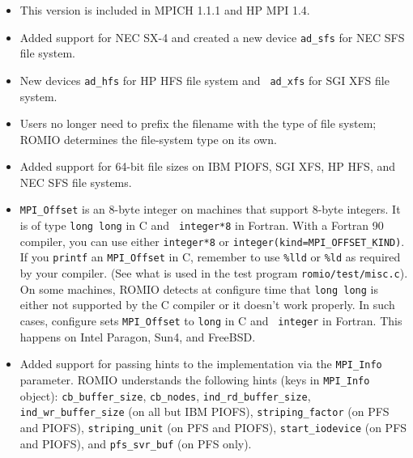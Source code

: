 \begin{itemize}
\item This version is included in MPICH 1.1.1 and HP MPI 1.4.

\item Added support for NEC SX-4 and created a new device {\tt ad\_sfs} for
NEC SFS file system.

\item New devices {\tt ad\_hfs} for HP HFS file system and {\tt
ad\_xfs} for SGI XFS file system.

\item Users no longer need to prefix the filename with the type of 
file system; ROMIO determines the file-system type on its own.

\item Added support for 64-bit file sizes on IBM PIOFS, SGI XFS,
HP HFS, and NEC SFS file systems.

\item {\tt MPI\_Offset} is an 8-byte integer on machines that support
8-byte integers. It is of type {\tt long long} in C and {\tt
integer*8} in Fortran. With a Fortran 90 compiler, you can use either
{\tt integer*8} or  {\tt integer(kind=MPI\_OFFSET\_KIND)}. 
If you {\tt printf} an {\tt MPI\_Offset} in C, remember to use {\tt \%lld} 
or {\tt \%ld} as required by your compiler. (See what is used in the test 
program {\tt romio/test/misc.c}).
On some machines, ROMIO detects at configure time that {\tt long long} is 
either not supported by the C compiler or it doesn't work properly.
In such cases, configure sets {\tt MPI\_Offset} to {\tt long} in C and {\tt
integer} in Fortran. This happens on Intel Paragon, Sun4, and FreeBSD.

\item Added support for passing hints to the implementation via the
{\tt MPI\_Info} parameter. ROMIO understands the following hints (keys
in {\tt MPI\_Info} object):
\texttt{cb\_buffer\_size},
\texttt{cb\_nodes},\newline
\texttt{ind\_rd\_buffer\_size},
\texttt{ind\_wr\_buffer\_size} (on all but IBM PIOFS),
\texttt{striping\_factor} (on PFS and PIOFS),
\texttt{striping\_unit} (on PFS and PIOFS),
\texttt{start\_iodevice} (on PFS and PIOFS),
and \texttt{pfs\_svr\_buf} (on PFS only).
      
\end{itemize}
\newpage


%



